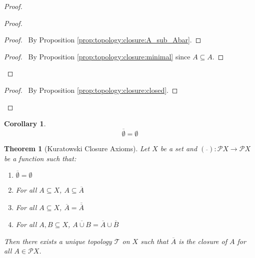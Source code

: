 \documentclass{report}
\let\qed\relax
\newtheorem{thm}[lm]{Theorem}
\newtheorem{cor}{Corollary}[lm]
\theoremstyle{definition}
\begin{document}
  \begin{proof}
    \pf
    \begin{proof}
      \begin{proof}
        \pf\ By Proposition \ref{prop:topology:closure:A_sub_Abar}.
      \end{proof}
      \begin{proof}
        \pf\ By Proposition \ref{prop:topology:closure:minimal} since $A
        \subseteq A$.
      \end{proof}
    \end{proof}
    \begin{proof}
      \pf\ By Proposition \ref{prop:topology:closure:closed}.
    \end{proof}
    \qed
  \end{proof}

  \begin{cor}
    \[ \overline{\emptyset} = \emptyset \]
  \end{cor}

  \begin{thm}[Kuratowski Closure Axioms]
    Let $X$ be a set and $(\overline{\ }) : \mathcal{P} X \rightarrow
    \mathcal{P} X$ be a function such that:
    \begin{enumerate}
      \item $\overline{\emptyset} = \emptyset$
      \item For all $A \subseteq X$, $A \subseteq \overline{A}$
      \item For all $A \subseteq X$, $\overline{A} = \overline{\overline{A}}$
      \item For all $A, B \subseteq X$, $\overline{A \cup B} = \overline{A}
      \cup
      \overline{B}$
    \end{enumerate}
    Then there exists a unique topology $\mathcal{T}$ on $X$ such that
    $\overline{A}$ is the closure of $A$ for all $A \in \mathcal{P} X$.
  \end{thm}
\end{document}
